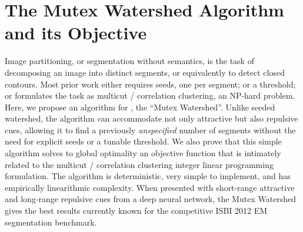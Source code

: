 
\chapter{The Mutex Watershed Algorithm and its Objective}
Image partitioning, or segmentation without semantics, is the task of decomposing an image into distinct segments, or equivalently to detect closed contours. Most prior work either requires seeds, one per segment; or a threshold; or formulates the task as multicut / correlation clustering, an NP-hard problem. Here, we propose an  algorithm for , the ``Mutex Watershed''. Unlike seeded watershed, the algorithm can accommodate not only attractive but also repulsive cues, allowing it to find a previously \emph{unspecified} number of segments without the need for explicit seeds or a tunable threshold. We also prove that this simple algorithm solves to global optimality an objective function that is intimately related to the multicut / correlation clustering integer linear programming formulation. 
The algorithm is deterministic, very simple to implement, and has empirically linearithmic complexity. 
When presented with short-range attractive and long-range repulsive cues from a deep neural network, the Mutex Watershed gives the best results currently known for the %
competitive ISBI 2012 EM segmentation benchmark.

